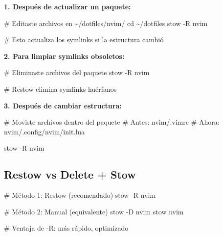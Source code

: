 \documentclass[
  doc,
  floatsintext,
  longtable,
  a4paper,
  nolmodern,
  notxfonts,
  notimes,
  12pt,
  colorlinks=true,linkcolor=blue,citecolor=blue,urlcolor=blue]{apa7}
\newenvironment{Shaded}{\begin{snugshade}}{\end{snugshade}}
\newcommand{\AttributeTok}[1]{\textcolor[rgb]{0.40,0.45,0.13}{#1}}
\newcommand{\BuiltInTok}[1]{\textcolor[rgb]{0.00,0.23,0.31}{#1}}
\newcommand{\CommentTok}[1]{\textcolor[rgb]{0.37,0.37,0.37}{#1}}
\newcommand{\ExtensionTok}[1]{\textcolor[rgb]{0.00,0.23,0.31}{#1}}
\newcommand{\NormalTok}[1]{\textcolor[rgb]{0.00,0.23,0.31}{#1}}
\begin{document}
\textbf{1. Después de actualizar un paquete:}

\begin{Shaded}
\begin{Highlighting}[]
\CommentTok{\# Editaste archivos en \textasciitilde{}/dotfiles/nvim/}
\BuiltInTok{cd}\NormalTok{ \textasciitilde{}/dotfiles}
\ExtensionTok{stow} \AttributeTok{{-}R}\NormalTok{ nvim}

\CommentTok{\# Esto actualiza los symlinks si la estructura cambió}
\end{Highlighting}
\end{Shaded}

\textbf{2. Para limpiar symlinks obsoletos:}

\begin{Shaded}
\begin{Highlighting}[]
\CommentTok{\# Eliminaste archivos del paquete}
\ExtensionTok{stow} \AttributeTok{{-}R}\NormalTok{ nvim}

\CommentTok{\# Restow elimina symlinks huérfanos}
\end{Highlighting}
\end{Shaded}

\textbf{3. Después de cambiar estructura:}

\begin{Shaded}
\begin{Highlighting}[]
\CommentTok{\# Moviste archivos dentro del paquete}
\CommentTok{\# Antes: nvim/.vimrc}
\CommentTok{\# Ahora: nvim/.config/nvim/init.lua}

\ExtensionTok{stow} \AttributeTok{{-}R}\NormalTok{ nvim}
\end{Highlighting}
\end{Shaded}

\subsection{Restow vs Delete + Stow}\label{restow-vs-delete-stow}

\begin{Shaded}
\begin{Highlighting}[]
\CommentTok{\# Método 1: Restow (recomendado)}
\ExtensionTok{stow} \AttributeTok{{-}R}\NormalTok{ nvim}

\CommentTok{\# Método 2: Manual (equivalente)}
\ExtensionTok{stow} \AttributeTok{{-}D}\NormalTok{ nvim}
\ExtensionTok{stow}\NormalTok{ nvim}

\CommentTok{\# Ventaja de {-}R: más rápido, optimizado}
\end{Highlighting}
\end{Shaded}
\end{document}
